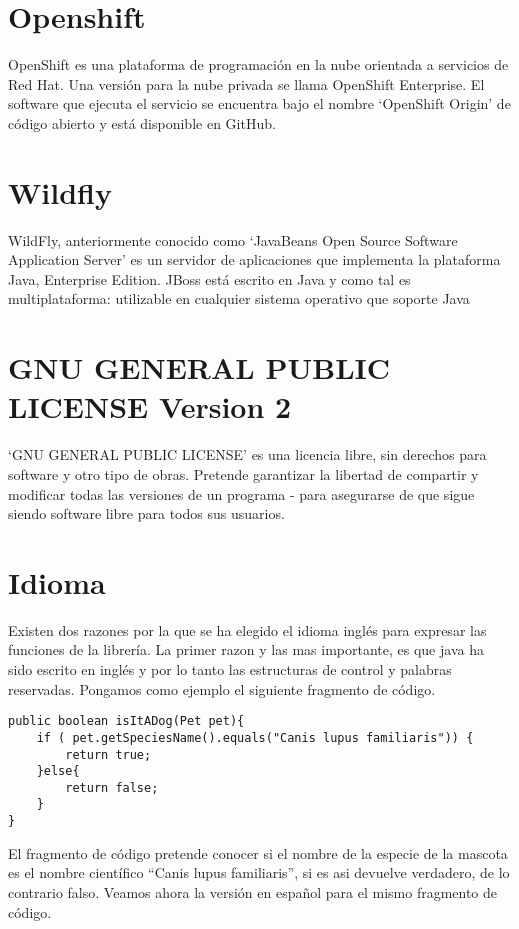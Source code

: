 	\section{Openshift}
		OpenShift es una plataforma de programación en la nube orientada a servicios de Red Hat. Una versión para la nube privada se llama OpenShift Enterprise. El software que ejecuta el servicio se encuentra bajo el nombre `OpenShift Origin' de código abierto y está disponible en GitHub.

	\section{Wildfly}
		WildFly, anteriormente conocido como `JavaBeans Open Source Software Application Server' es un servidor de aplicaciones que implementa la plataforma Java, Enterprise Edition. JBoss está escrito en Java y como tal es multiplataforma: utilizable en cualquier sistema operativo que soporte Java

	\section{GNU GENERAL PUBLIC LICENSE Version 2}

		`GNU GENERAL PUBLIC LICENSE' es una licencia libre, sin derechos para software y otro tipo de obras. Pretende garantizar la libertad de compartir y modificar todas las versiones de un programa - para asegurarse de que sigue siendo software libre para todos sus usuarios.
		
	\section{Idioma}

		Existen dos razones por la que se ha elegido el idioma inglés para expresar las funciones de la librería. La primer razon y las mas importante, es que java ha sido escrito en inglés y por lo tanto las estructuras de control y palabras reservadas. Pongamos como ejemplo el siguiente fragmento de código.

\begin{lstlisting}
public boolean isItADog(Pet pet){
	if ( pet.getSpeciesName().equals("Canis lupus familiaris")) {
		return true;
	}else{
		return false;
	}
}
\end{lstlisting}

	El fragmento de código pretende conocer si el nombre de la especie de la mascota es el nombre científico ``Canis lupus familiaris'', si es asi devuelve verdadero, de lo contrario falso. Veamos ahora la versión en español para el mismo fragmento de código.

